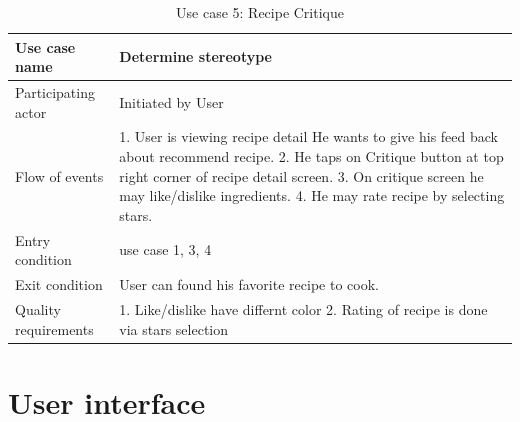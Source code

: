    
    \begin{table}[ht]
    	\centering %
    	\begin{tabular}{p{4cm} p{10cm}}  %
    		\hline\hline %
    		Use case name & Determine stereotype \\ %
    		\hline %
    		
    		Participating actor & Initiated by User \\ %
    		Flow of events & 1. User is viewing recipe detail 
			He wants to give his feed back about recommend recipe. 
			2. He taps on Critique button at top right corner of recipe detail screen. 
			3. On critique screen he may like/dislike ingredients. 
			4. He may rate recipe by selecting stars.\\
    		Entry condition & use case 1, 3, 4\\
    		Exit condition & User can found his favorite recipe to cook.\\
    		Quality requirements & 1. Like/dislike have differnt color 2. Rating of recipe is done via stars selection\\ [1ex] %
    		\hline %
    	\end{tabular}
    	\caption{Use case 5: Recipe Critique}
    	\label{table:recipe_ingredient_critique}
    \end{table}
    
    
\section{User interface}    


